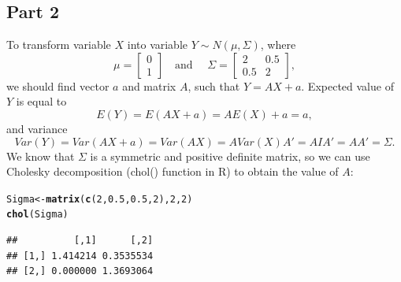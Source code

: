 \documentclass[12pt, a4paper]{article}\usepackage[]{graphicx}\usepackage[]{color}
\makeatletter
\newcommand{\hlnum}[1]{\textcolor[rgb]{0.686,0.059,0.569}{#1}}%
\newcommand{\hlstd}[1]{\textcolor[rgb]{0.345,0.345,0.345}{#1}}%
\newcommand{\hlkwb}[1]{\textcolor[rgb]{0.69,0.353,0.396}{#1}}%
\newcommand{\hlkwd}[1]{\textcolor[rgb]{0.737,0.353,0.396}{\textbf{#1}}}%
\newenvironment{kframe}{%
 \def\at@end@of@kframe{}%
 \ifinner\ifhmode%
  \def\at@end@of@kframe{\end{minipage}}%
  \begin{minipage}{\columnwidth}%
 \fi\fi%
 \def\FrameCommand##1{\hskip\@totalleftmargin \hskip-\fboxsep
 \colorbox{shadecolor}{##1}\hskip-\fboxsep
     \hskip-\linewidth \hskip-\@totalleftmargin \hskip\columnwidth}%
 \MakeFramed {\advance\hsize-\width
   \@totalleftmargin\z@ \linewidth\hsize
   \@setminipage}}%
 {\par\unskip\endMakeFramed%
 \at@end@of@kframe}
\newenvironment{knitrout}{}{} %
\makeatother
\begin{document}
\subsection{Part 2}
To transform variable $X$ into variable $Y \sim N(\mu, \Sigma)$, where 
\[\mu = \left[
    \begin{matrix}  
      0 \\
      1
    \end{matrix} 
    \right]
  \quad \text{and }\quad 
  \Sigma = \left[
    \begin{matrix}  
      2   & 0.5 \\
      0.5 & 2
    \end{matrix} 
    \right],
\]
we should find vector $a$ and matrix $A$, such that $Y=A X + a$. 
Expected value of $Y$ is equal to
\[E(Y) = E(AX+a) = A E(X)+a = a, \]
and variance
\[Var(Y) = Var(AX+a) = Var(AX) = A Var(X) A' = A I A' = A A' = \Sigma. \]
We know that $\Sigma$ is a symmetric and positive definite matrix, so we can use Cholesky decomposition (chol() function in R) to obtain the value of $A$:
\begin{knitrout}
\color{fgcolor}\begin{kframe}
\begin{alltt}
\hlstd{Sigma} \hlkwb{<-} \hlkwd{matrix}\hlstd{(}\hlkwd{c}\hlstd{(}\hlnum{2}\hlstd{,} \hlnum{0.5}\hlstd{,} \hlnum{0.5}\hlstd{,} \hlnum{2}\hlstd{),} \hlnum{2}\hlstd{,} \hlnum{2}\hlstd{)}
\hlkwd{chol}\hlstd{(Sigma)}
\end{alltt}
\begin{verbatim}
##          [,1]      [,2]
## [1,] 1.414214 0.3535534
## [2,] 0.000000 1.3693064
\end{verbatim}
\end{kframe}
\end{knitrout}
\end{document}
